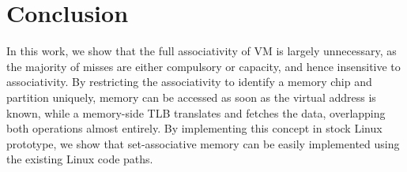 \section{Conclusion}
\label{sec:conclusion}

In this work, we show that the full associativity of VM is largely unnecessary, as the majority of misses are either compulsory or capacity, and hence insensitive to associativity. By restricting the associativity to identify a memory chip and partition uniquely, memory can be accessed as soon as the virtual address is known, while a memory-side TLB translates and fetches the data, overlapping both operations almost entirely. By implementing this concept in stock Linux prototype, we show that set-associative memory can be easily implemented using the existing Linux code paths. 




\newpage
